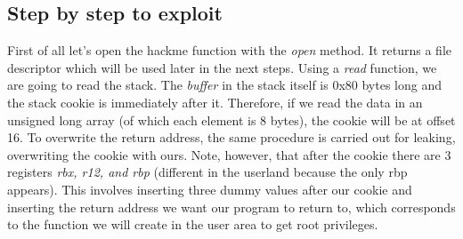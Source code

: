 \documentclass{masterthesis}
\begin{document}
\subsection{Step by step to exploit}
First of all let's open the hackme function with the \emph{open} method. It returns a file descriptor which will be used later in the next steps.
Using a \emph{read} function, we are going to read the stack.
The \emph{buffer} in the stack itself is 0x80 bytes long and the stack cookie is immediately after it. Therefore, if we read the data in an unsigned long array (of which each element is 8 bytes), the cookie will be at offset 16.
To overwrite the return address, the same procedure is carried out for leaking, overwriting the cookie with ours. Note, however, that after the cookie there are 3 registers \emph{rbx, r12, and rbp} (different in the userland because the only rbp appears).
This involves inserting three dummy values after our cookie and inserting the return address we want our program to return to, which corresponds to the function we will create in the user area to get root privileges.
\end{document}
